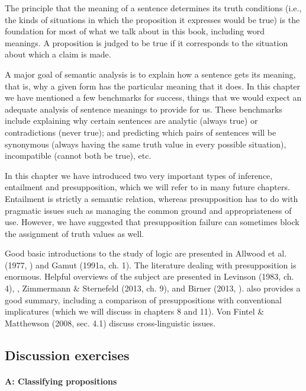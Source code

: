 The principle that the meaning of a sentence determines its truth conditions (i.e., the kinds of situations in which the proposition it expresses would be true) is the foundation for most of what we talk about in this book, including word meanings. A proposition is judged to be true if it corresponds to the situation about which a claim is made.



A major goal of semantic analysis is to explain how a sentence gets its meaning, that is, why a given form has the particular meaning that it does. In this chapter we have mentioned a few benchmarks for success, things that we would expect an adequate analysis of sentence meanings to provide for us. These benchmarks include explaining why certain sentences are analytic (always true) or contradictions (never true); and predicting which pairs of sentences will be synonymous (always having the same truth value in every possible situation), incompatible (cannot both be true), etc.



In this chapter we have introduced two very important types of inference, entailment and presupposition, which we will refer to in many future chapters. Entailment is strictly a semantic relation, whereas presupposition has to do with pragmatic issues such as managing the common ground and appropriateness of use. However, we have suggested that presupposition failure can sometimes block the assignment of truth values as well.



\furtherreading



Good basic introductions to the study of logic are presented in Allwood et al. (1977, ) and Gamut (1991a, ch. 1). The literature dealing with presupposition is enormous. Helpful overviews of the subject are presented in Levinson (1983, ch. 4), \citet{GeurtsBeaver2011}, Zimmermann \& Sternefeld (2013, ch. 9), and Birner (2013, ). \citet{Potts2015} also provides a good summary, including a comparison of presuppositions with conventional implicatures (which we will discuss in chapters 8 and 11). Von Fintel \& Matthewson (2008, sec. 4.1) discuss cross-linguistic issues.


\subsection*{Discussion exercises}
\paragraph*{A: Classifying propositions}

